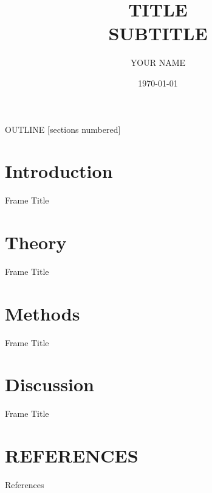 \documentclass[15pt, numbering = counter]{beamer}
\title{TITLE \\
{\small SUBTITLE}}
\author{YOUR NAME}
\institute{YOUR AFFILIATION}
\date{\today}
\begin{document}
\maketitle

\begin{frame}{OUTLINE}
  [sections numbered]
  \tableofcontents[hideallsubsections]
\end{frame}

\section{Introduction}
\begin{frame}{Frame Title}
    
\end{frame}

\section{Theory}
\begin{frame}{Frame Title}
    
\end{frame}

\section{Methods}
\begin{frame}{Frame Title}
    
\end{frame}

\section{Discussion}
\begin{frame}{Frame Title}
    
\end{frame}

\section*{REFERENCES}
\begin{frame}[allowframebreaks]{References}
    \tiny
\end{frame}

\appendix
\end{document}
